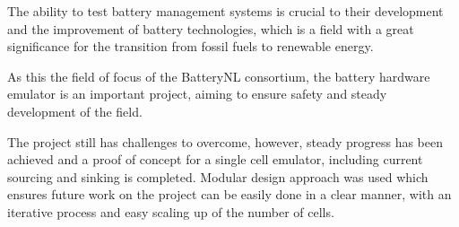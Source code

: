 \IEEEPARstart
{T}{he} ability to test battery management systems is crucial 
to their development and the improvement of battery technologies,
which is a field with a great significance for the transition
from fossil fuels to renewable energy. 

As this the field of focus of the BatteryNL consortium, the
battery hardware emulator is an important project, aiming to 
ensure safety and steady development of the field. 

The project still has challenges to overcome, however, steady progress
has been achieved and a proof of concept for a single cell emulator, including 
current sourcing and sinking is completed. Modular design approach was used 
which ensures future work on the project can be easily done in a clear 
manner, with an iterative process and easy scaling up of the number of cells. 